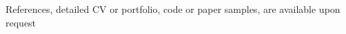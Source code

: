 \documentclass[10pt]{article}
\begin{document}






\vspace{10pt}
\small{References, detailed CV or portfolio, code or paper samples, are available upon request}
\end{document}
